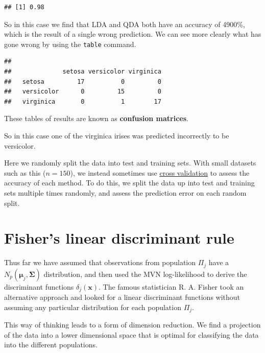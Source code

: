 \documentclass[
]{book}
\newenvironment{Shaded}{\begin{snugshade}}{\end{snugshade}}
\newcommand{\FunctionTok}[1]{\textcolor[rgb]{0.13,0.29,0.53}{\textbf{#1}}}
\newcommand{\NormalTok}[1]{#1}
\newcommand{\SpecialCharTok}[1]{\textcolor[rgb]{0.81,0.36,0.00}{\textbf{#1}}}
\theoremstyle{definition}
\theoremstyle{definition}
\theoremstyle{definition}
\theoremstyle{definition}
\theoremstyle{remark}
\begin{document}
\begin{verbatim}
## [1] 0.98
\end{verbatim}

So in this case we find that LDA and QDA both have an accuracy of 4900\%, which is the result of a single wrong prediction. We can see more clearly what has gone wrong by using the \texttt{table} command.

\begin{Shaded}
\end{Shaded}

\begin{verbatim}
##             
##              setosa versicolor virginica
##   setosa         17          0         0
##   versicolor      0         15         0
##   virginica       0          1        17
\end{verbatim}

These tables of results are known as \textbf{confusion matrices}.

So in this case one of the virginica irises was predicted incorrectly to be versicolor.

Here we randomly split the data into test and training sets. With small datasets such as this (\(n=150\)), we instead sometimes use \href{https://en.wikipedia.org/wiki/Cross-validation_(statistics)}{cross validation} to assess the accuracy of each method. To do this, we split the data up into test and training sets multiple times randomly, and assess the prediction error on each random split.

\section{Fisher's linear discriminant rule}\label{FLDA}

Thus far we have assumed that observations from population \(\Pi_j\) have a \(N_p ( \boldsymbol{\mu}_j, {\mathbf \Sigma})\) distribution, and then used the MVN log-likelihood to derive the discriminant functions \(\delta_j(\mathbf x)\). The famous statistician R. A. Fisher took an alternative approach and looked for a linear discriminant functions without assuming any particular distribution for each population \(\Pi_j\).

This way of thinking leads to a form of dimension reduction. We find a projection of the data into a lower dimensional space that is optimal for classifying the data into the different populations.
\end{document}
